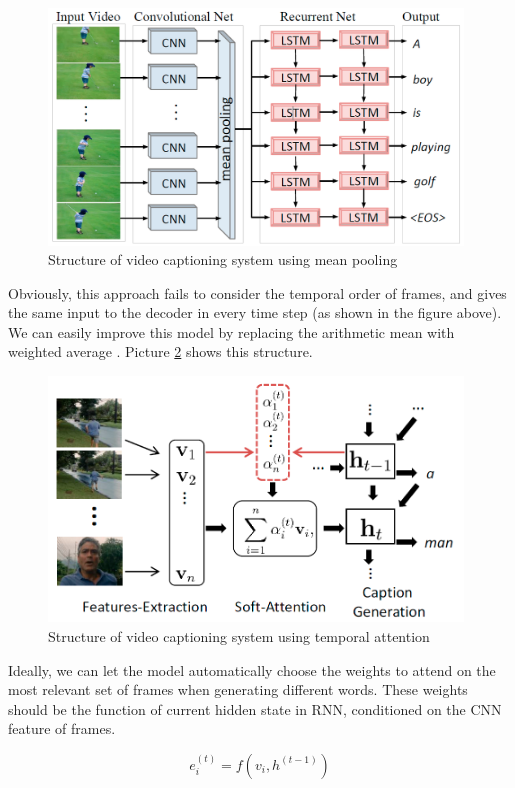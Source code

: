 \begin{figure}
\centering
\includegraphics[width=11cm]{resources/mp.png}
\caption{Structure of video captioning system using mean pooling \cite{venugopalan2014translating}}
\label{fig:mp}
\end{figure}

Obviously, this approach fails to consider the temporal order of frames, and gives the same input to the decoder in every time step (as shown in the figure above). We can easily improve this model by replacing the arithmetic mean with weighted average \cite{yao2015describing}. Picture \ref{fig:sa} shows this structure.

\begin{figure}
\centering
\includegraphics[width=11cm]{resources/sa.png}
\caption{Structure of video captioning system using temporal attention \cite{yao2015describing}}
\label{fig:sa}
\end{figure}

Ideally, we can let the model automatically choose the weights to attend on the most relevant set of frames when generating different words. These weights should be the function of current hidden state in RNN, conditioned on the CNN feature of frames.

\begin{equation}
e_{i}^{(t)} = f(v_i, h^{(t-1)})
\end{equation}

